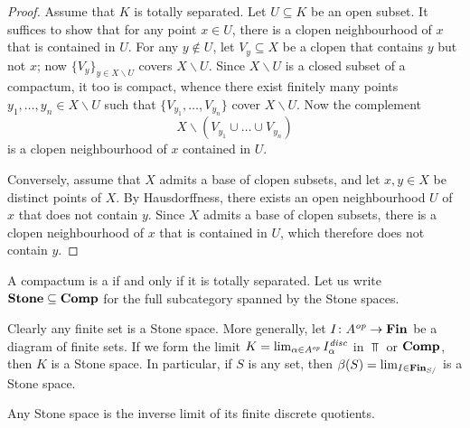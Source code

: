 \begin{proof}
	Assume that $ K $ is totally separated.
	Let $ U \subseteq K $ be an open subset.
	It suffices to show that for any point $ x \in U $, there is a clopen neighbourhood of $ x $ that is contained in $ U $.
	For any $ y \notin U $, let $ V_y \subseteq X $ be a clopen that contains $ y $ but not $ x $;
	now $ \{ V_y \}_{y \in X \smallsetminus U} $ covers $ X \smallsetminus U $.
	Since $ X \smallsetminus U $ is a closed subset of a compactum, it too is compact, whence there exist finitely many points $ y_1, \dots, y_n \in X \smallsetminus U $ such that $ \{ V_{y_1}, \dots, V_{y_n} \} $ cover $ X \smallsetminus U $.
	Now the complement 
	\[
		X \smallsetminus (V_{y_1} \cup \dots \cup V_{y_n})
	\]
	is a clopen neighbourhood of $ x $ contained in $ U $.

	Conversely, assume that $ X $ admits a base of clopen subsets, and let $ x, y \in X $ be distinct points of $ X $.
	By Hausdorffness, there exists an open neighbourhood $ U $ of $ x $ that does not contain $ y $. 
	Since $ X $ admits a base of clopen subsets, there is a clopen neighbourhood of $ x $ that is contained in $ U $, which therefore does not contain $ y $.
\end{proof}

\begin{dfn}
	A compactum is a  if and only if it is totally separated.
	Let us write $ \textbf{\textup{Stone}} \subseteq \textbf{\textup{Comp}} $ for the full subcategory spanned by the Stone spaces.
\end{dfn}

\begin{exm}
	Clearly any finite set is a Stone space.
	More generally, let $ I \colon A^{\textit{op}} \to \textbf{\textup{Fin}} $ be a diagram of finite sets.
	If we form the limit $ K = \lim_{\alpha \in A^{\textit{op}}} I_{\alpha}^{\textit{disc}}$ in $ \Top $ or $ \textbf{\textup{Comp}} $, then $ K $ is a Stone space.
	In particular, if $ S $ is any set, then $ \beta(S) = \lim_{I \in \textbf{\textup{Fin}}_{S/}} $ is a Stone space.
\end{exm}

\begin{lem}
	Any Stone space is the inverse limit of its finite discrete quotients.
\end{lem}

